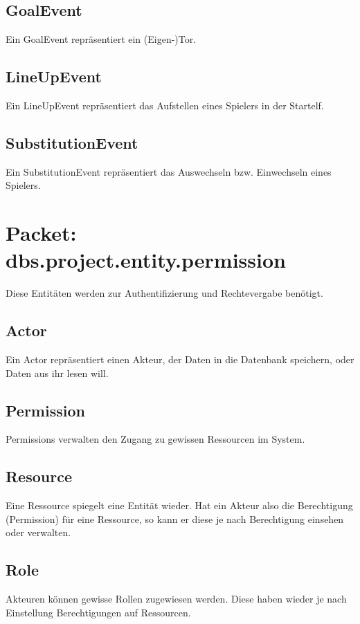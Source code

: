 \documentclass[11pt,german]{scrartcl}
\begin{document}
\subsection{GoalEvent}
Ein GoalEvent repräsentiert ein (Eigen-)Tor.

\subsection{LineUpEvent}
Ein LineUpEvent repräsentiert das Aufstellen eines Spielers in der Startelf.

\subsection{SubstitutionEvent}
Ein SubstitutionEvent repräsentiert das Auswechseln bzw. Einwechseln eines Spielers.

\section{Packet: dbs.project.entity.permission}
Diese Entitäten werden zur Authentifizierung und Rechtevergabe benötigt.

\subsection{Actor}
Ein Actor repräsentiert einen Akteur, der Daten in die Datenbank speichern, oder Daten aus ihr lesen will.

\subsection{Permission}
Permissions verwalten den Zugang zu gewissen Ressourcen im System.

\subsection{Resource}
Eine Ressource spiegelt eine Entität wieder. Hat ein Akteur also die Berechtigung (Permission) für eine Ressource, so kann er diese je nach Berechtigung einsehen oder verwalten.

\subsection{Role}
Akteuren können gewisse Rollen zugewiesen werden. Diese haben wieder je nach Einstellung Berechtigungen auf Ressourcen.
%
\end{document}
